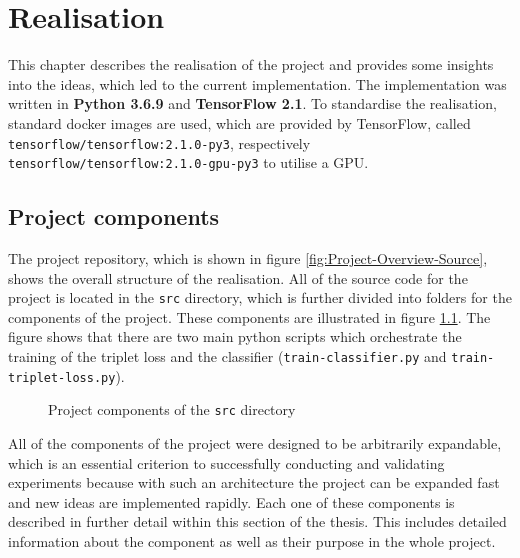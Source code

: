 \chapter{Realisation}
\label{ch:Realisation}
This chapter describes the realisation of the project and provides some insights into the ideas, which led to the current implementation. The implementation was written in \textbf{Python 3.6.9} and \textbf{TensorFlow 2.1}. To standardise the realisation, standard docker images are used, which are provided by TensorFlow, called \texttt{tensorflow/tensorflow:2.1.0-py3}, respectively \texttt{tensorflow/tensorflow:2.1.0-gpu-py3} to utilise a GPU.

\section{Project components}
\label{sec:Project-Components}
The project repository, which is shown in figure \ref{fig:Project-Overview-Source}, shows the overall structure of the realisation. All of the source code for the project is located in the \texttt{src} directory, which is further divided into folders for the components of the project. These components are illustrated in figure \ref{sec:Project-Components}. The figure shows that there are two main python scripts which orchestrate the training of the triplet loss and the classifier (\texttt{train-classifier.py} and \texttt{train-triplet-loss.py}). 

\begin{figure}[ht]
\caption{Project components of the \texttt{src} directory}
\label{fig:Project-Components}
\end{figure}
\noindent
All of the components of the project were designed to be arbitrarily expandable, which is an essential criterion to successfully conducting and validating experiments because with such an architecture the project can be expanded fast and new ideas are implemented rapidly.
\newline
\newline
Each one of these components is described in further detail within this section of the thesis. This includes detailed information about the component as well as their purpose in the whole project.

